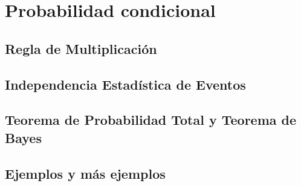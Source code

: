 \section{Probabilidad condicional}
    \lipsum
    \subsection{Regla de Multiplicación}
        \lipsum[1]
    \subsection{Independencia Estadística de Eventos}
        \lipsum[1]
    \subsection{Teorema de Probabilidad Total y Teorema de Bayes}
        \lipsum[1]
    \subsection{Ejemplos y más ejemplos}
        \lipsum[1]
